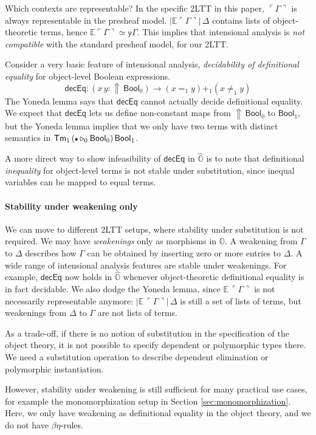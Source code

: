 \documentclass[acmsmall,screen]{acmart}
\newcommand{\msf}[1]{\mathsf{#1}}
\newcommand{\mbb}[1]{\mathbb{#1}}
\newcommand{\ext}{\triangleright}
\newcommand{\Lift}{{\Uparrow}}
\newcommand{\mbbo}{\mbb{O}}
\newcommand{\Tm}{\msf{Tm}}
\newcommand{\Bool}{\msf{Bool}}
\newcommand{\emptycon}{\scaleobj{.75}\bullet}
\newcommand{\emb}[1]{\ulcorner#1\urcorner}
\newcommand{\hato}{\bm\hat{\mbbo}}
\newcommand{\ev}{\mbb{E}}
\theoremstyle{remark}
\newcommand{\yon}{\msf{y}}
\begin{document}
Which contexts are representable? In the specific 2LTT in this paper,
$\emb{\Gamma}$ is always representable in the presheaf
model. $|\ev{\emb{\Gamma}}|\,\Delta$ contains lists of object-theoretic terms,
hence $\ev{\emb{\Gamma}} \simeq \yon \Gamma$.  This implies that intensional
analysis is \emph{not compatible} with the standard presheaf model, for our
2LTT.

Consider a very basic feature of intensional analysis, \emph{decidability of
definitional equality} for object-level Boolean expressions.
\[
  \msf{decEq} : (x\,y : \Lift\,\Bool_0) \to (x =_1 y) +_1 (x \neq_1 y)
\]
The Yoneda lemma says that $\msf{decEq}$ cannot actually decide
definitional equality. We expect that $\msf{decEq}$ lets us define non-constant
maps from $\Lift\,\Bool_0$ to $\Bool_1$, but the Yoneda lemma implies that we
only have two terms with distinct semantics in $\Tm_1\,(\emptycon \ext_0
\Bool_0)\,\Bool_1$.

A more direct way to show infeasibility of $\msf{decEq}$ in $\hato$ is to note
that definitional \emph{inequality} for object-level terms is not stable under
substitution, since inequal variables can be mapped to equal terms.

\paragraph{Stability under weakening only}
We can move to different 2LTT setups, where stability under substitution is not
required. We may have \emph{weakenings} only as morphisms in $\mbbo$.  A
weakening from $\Gamma$ to $\Delta$ describes how $\Gamma$ can be obtained by
inserting zero or more entries to $\Delta$. A wide range of intensional analysis
features are stable under weakenings. For example, $\msf{decEq}$ now holds in
$\hato$ whenever object-theoretic definitional equality is in fact decidable.
We also dodge the Yoneda lemma, since $\ev\,\emb{\Gamma}$ is not necessarily
representable anymore: $|\ev\,\emb{\Gamma}|\,\Delta$ is still a set of lists of
terms, but weakenings from $\Delta$ to $\Gamma$ are not lists of terms.

As a trade-off, if there is no notion of substitution in the specification of the
object theory, it is not possible to specify dependent or polymorphic types
there. We need a substitution operation to describe dependent elimination or
polymorphic instantiation.

However, stability under weakening is still sufficient for many practical use
cases, for example the monomorphization setup in Section
\ref{sec:monomorphization}. Here, we only have weakening as definitional
equality in the object theory, and we do not have $\beta\eta$-rules.
\end{document}
